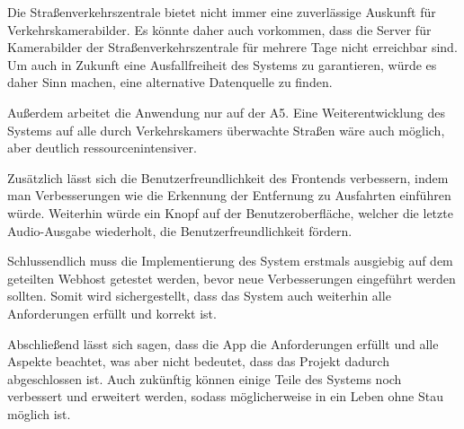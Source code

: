 Die Straßenverkehrszentrale bietet nicht immer eine zuverlässige Auskunft für Verkehrskamerabilder.
Es könnte daher auch vorkommen, dass die Server für Kamerabilder der Straßenverkehrszentrale für mehrere Tage nicht erreichbar sind.
Um auch in Zukunft eine Ausfallfreiheit des Systems zu garantieren, würde es daher Sinn machen, eine alternative Datenquelle zu finden.

Außerdem arbeitet die Anwendung nur auf der A5. Eine Weiterentwicklung des Systems auf alle durch Verkehrskamers überwachte Straßen wäre auch möglich, aber deutlich ressourcenintensiver.

Zusätzlich lässt sich die Benutzerfreundlichkeit des Frontends verbessern, indem man Verbesserungen wie die Erkennung der Entfernung zu Ausfahrten einführen würde.
Weiterhin würde ein Knopf auf der Benutzeroberfläche, welcher die letzte Audio-Ausgabe wiederholt, die Benutzerfreundlichkeit fördern.

Schlussendlich muss die Implementierung des System erstmals ausgiebig auf dem geteilten Webhost getestet werden, bevor neue Verbesserungen eingeführt werden sollten.
Somit wird sichergestellt, dass das System auch weiterhin alle Anforderungen erfüllt und korrekt ist.

Abschließend lässt sich sagen, dass die App die Anforderungen erfüllt und alle Aspekte beachtet, was aber nicht bedeutet, dass das Projekt dadurch abgeschlossen ist. Auch zukünftig können einige Teile des Systems noch verbessert und erweitert werden, sodass möglicherweise in ein Leben ohne Stau möglich ist.